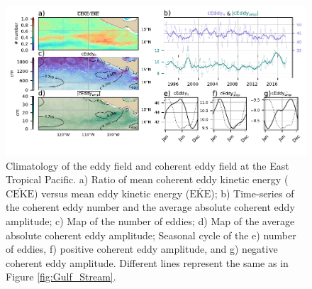 \documentclass[draft,linenumbers]{agujournal2019}
\newcommand{\MEKE}{\overline{\textrm{EKE}}}
\newcommand{\MCEKE}{\overline{\textrm{CEKE}}}
\begin{document}
	\begin{figure}
	    \centering
	    \includegraphics[width=1\textwidth]{figures/regional_ratios_and_stats_V3_3.pdf}
	    \caption{Climatology of the eddy field and coherent eddy field at the East Tropical Pacific. a) Ratio of mean coherent eddy kinetic energy ($\MCEKE$) versus mean eddy kinetic energy ($\MEKE$); b) Time-series of the coherent eddy number and the average absolute coherent eddy amplitude; c) Map of the number of eddies; d) Map of the average absolute coherent eddy amplitude; Seasonal cycle of the e) number of eddies, f) positive coherent eddy amplitude, and g) negative coherent eddy amplitude. Different lines represent the same as in Figure \ref{fig:Gulf_Stream}.}
	    \label{fig:tehuantepec}
	\end{figure}	
	







\end{document}
